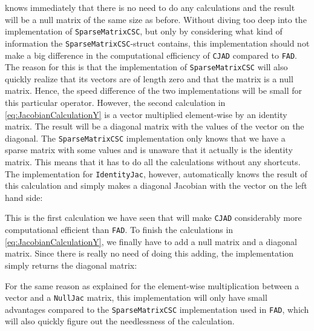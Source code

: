 knows immediately that there is no need to do any calculations and the result will be a null matrix of the same size as before. Without diving too deep into the implementation of \texttt{SparseMatrixCSC}, but only by considering what kind of information the \texttt{SparseMatrixCSC}-struct contains, this implementation should not make a big difference in the computational efficiency of \texttt{CJAD} compared to \texttt{FAD}. The reason for this is that the implementation of \texttt{SparseMatrixCSC} will also quickly realize that its vectors are of length zero and that the matrix is a null matrix. Hence, the speed difference of the two implementations will be small for this particular operator. However, the second calculation in \eqref{eq:JacobianCalculationY} is a vector multiplied element-wise by an identity matrix. The result will be a diagonal matrix with the values of the vector on the diagonal. The \texttt{SparseMatrixCSC} implementation only knows that we have a sparse matrix with some values and is unaware that it actually is the identity matrix. This means that it has to do all the calculations without any shortcuts.  The implementation for \texttt{IdentityJac}, however, automatically knows the result of this calculation and simply makes a diagonal Jacobian with the vector on the left hand side:

This is the first calculation we have seen that will make \texttt{CJAD} considerably more computational efficient than \texttt{FAD}. To finish the calculations in \eqref{eq:JacobianCalculationY}, we finally have to add a null matrix and a diagonal matrix. Since there is really no need of doing this adding, the implementation simply returns the diagonal matrix:

For the same reason as explained for the element-wise multiplication between a vector and a \texttt{NullJac} matrix, this implementation will only have small advantages compared to the \texttt{SparseMatrixCSC} implementation used in \texttt{FAD}, which will also quickly figure out the needlessness of the calculation.


